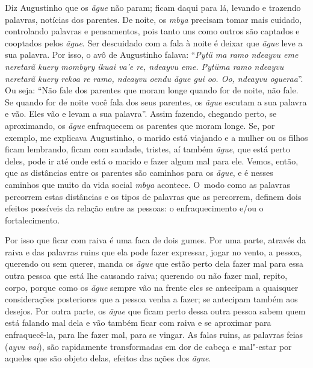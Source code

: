 Diz Augustinho que os \emph{ãgue} não param; ficam daqui para lá, levando e
trazendo palavras, notícias dos parentes. De noite, os \emph{mbya} precisam
tomar mais cuidado, controlando palavras e pensamentos, pois tanto uns
como outros são captados e cooptados pelos \emph{ãgue}. Ser descuidado com a
fala à noite é deixar que \emph{ãgue} leve a sua palavra. Por isso, o avô de
Augustinho falava: ``\emph{Pytü ma ramo ndeayvu eme neretarã kuery mombyry
ikuai va’e re, ndeayvu eme. Pytüma ramo ndeayvu neretarã kuery rekoa re
ramo, ndeayvu oendu ãgue gui oo. Oo, ndeayvu ogueraa}''. Ou seja: ``Não
fale dos parentes que moram longe quando for de noite, não fale. Se
quando for de noite você fala dos seus parentes, os \emph{ãgue} escutam a sua
palavra e vão. Eles vão e levam a sua palavra''. Assim fazendo, chegando
perto, se aproximando, os \emph{ãgue} enfraquecem os parentes que moram longe.
Se, por exemplo, me explicava Augustinho, o marido está viajando e a
mulher ou os filhos ficam lembrando, ficam com saudade, tristes, aí
também \emph{ãgue}, que está perto deles, pode ir até onde está o marido e fazer
algum mal para ele. Vemos, então, que as distâncias entre os parentes
são caminhos para os \emph{ãgue}, e é nesses caminhos que muito da vida social
\emph{mbya} acontece. O~modo como as palavras percorrem estas distâncias e
os tipos de palavras que as percorrem, definem dois efeitos possíveis
da relação entre as pessoas: o enfraquecimento e/ou o fortalecimento.

Por isso que ficar com raiva é uma faca de dois gumes. Por uma parte,
através da raiva e das palavras ruins que ela pode fazer expressar,
jogar no vento, a pessoa, querendo ou sem querer, manda os \emph{ãgue} que
estão perto dela fazer mal para essa outra pessoa que está lhe causando
raiva; querendo ou não fazer mal, repito, corpo, porque como os \emph{ãgue}
sempre vão na frente eles se antecipam a quaisquer considerações
posteriores que a pessoa venha a fazer; se antecipam também aos
desejos. Por outra parte, os \emph{ãgue} que ficam perto dessa outra pessoa
sabem quem está falando mal dela e vão também ficar com raiva e se
aproximar para enfraquecê-la, para lhe fazer mal, para se vingar. As
falas ruins, as palavras feias (\emph{ayvu vai}), são rapidamente
transformadas em dor de cabeça e mal"-estar por aqueles que são objeto
delas, efeitos das ações dos \emph{ãgue}.

